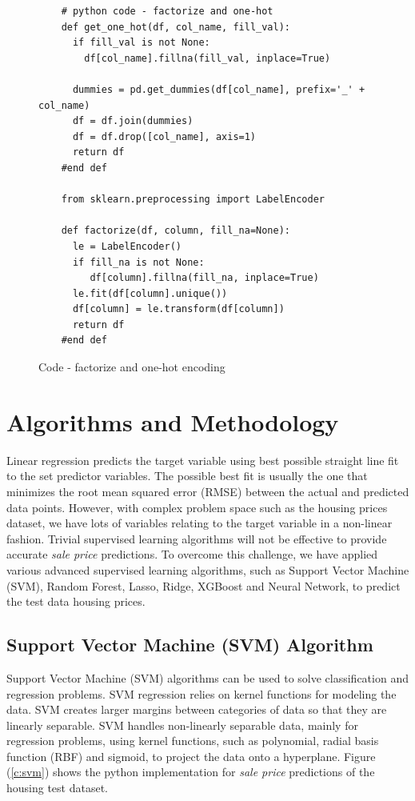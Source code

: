 \documentclass[sigconf]{acmart}
\begin{document}
	\begin{figure}[htb]	
	\begin{verbatim}	
	# python code - factorize and one-hot
	def get_one_hot(df, col_name, fill_val):
	  if fill_val is not None:
	    df[col_name].fillna(fill_val, inplace=True)
	
	  dummies = pd.get_dummies(df[col_name], prefix='_' + col_name)
	  df = df.join(dummies)
	  df = df.drop([col_name], axis=1)
	  return df
	#end def
	
	from sklearn.preprocessing import LabelEncoder
	
	def factorize(df, column, fill_na=None):
	  le = LabelEncoder()
	  if fill_na is not None:
	     df[column].fillna(fill_na, inplace=True)
	  le.fit(df[column].unique())
	  df[column] = le.transform(df[column])
	  return df
	#end def
	\end{verbatim}
	\caption{Code - factorize and one-hot encoding} \label{c:code-one-hot} 
	\end{figure}

	
	\section{Algorithms and Methodology}

	Linear regression predicts the target variable using best possible straight line fit to the set predictor variables. The possible best fit is usually the one that minimizes the root mean squared error (RMSE) between the actual and predicted data points. However, with complex problem space such as the housing prices dataset, we have lots of variables relating to the target variable in a non-linear fashion. Trivial supervised learning algorithms will not be effective to provide accurate {\em sale price} predictions. To overcome this challenge, we have applied various advanced supervised learning algorithms, such as Support Vector Machine (SVM), Random Forest, Lasso, Ridge, XGBoost and Neural Network, to predict the test data housing prices.
	
	 
	\subsection{Support Vector Machine (SVM) Algorithm}

	Support Vector Machine (SVM) algorithms can be used to solve classification and regression problems. SVM regression relies on kernel functions for modeling the data. SVM creates larger margins between categories of data so that they are linearly separable. SVM handles non-linearly separable data, mainly for regression problems, using kernel functions, such as polynomial, radial basis function (RBF) and sigmoid, to project the data onto a hyperplane. Figure (\ref{c:svm}) shows the python implementation for {\em sale price} predictions of the housing test dataset.
	
\end{document}
